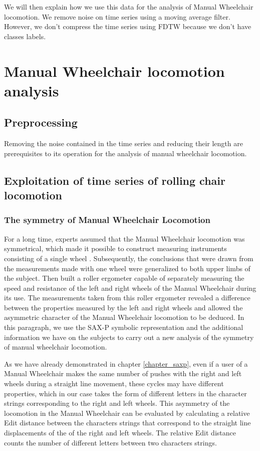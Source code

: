We will then explain how we use this data for the analysis of Manual Wheelchair locomotion. We remove noise on time series using a moving average filter. However, we don’t compress the time series using FDTW because we don’t have classes labels. 

\section{Manual Wheelchair locomotion analysis}

\subsection{Preprocessing}
Removing the noise contained in the time series and reducing their length are prerequisites to its operation for the analysis of manual wheelchair locomotion.

\subsection{Exploitation of time series of rolling chair locomotion}

\subsubsection{The symmetry of Manual Wheelchair Locomotion}
For a long time, experts assumed that the Manual Wheelchair locomotion was symmetrical, which made it possible to construct measuring instruments consisting of a single wheel \cite{brouha1967continuous}. Subsequently, the conclusions that were drawn from the measurements made with one wheel were generalized to both upper limbs of the subject. Then \cite{langbein1993research} built a roller ergometer capable of separately measuring the speed and resistance of the left and right wheels of the Manual Wheelchair during its use. The measurements taken from this roller ergometer revealed a difference between the properties measured by the left and right wheels and allowed the asymmetric character of the Manual Wheelchair locomotion to be deduced. In this paragraph, we use the SAX-P symbolic representation and the additional information we have on the subjects to carry out a new analysis of the symmetry of manual wheelchair locomotion.


As we have already demonstrated in chapter \ref{chapter_saxp}, even if a user of a Manual Wheelchair makes the same number of pushes with the right and left wheels during a straight line movement, these cycles may have different properties, which in our case takes the form of different letters in the character strings corresponding to the right and left wheels. This asymmetry of the locomotion in the Manual Wheelchair can be evaluated by calculating a relative Edit distance between the characters strings that correspond to the straight line displacements of the of the right and left wheels. The relative Edit distance counts the number of different letters between two characters strings.

